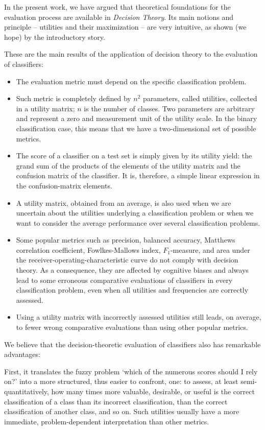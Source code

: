 \documentclass[\ifafour a4paper,12pt,\else a5paper,10pt,\fi%
onecolumn,oneside,article,%
british%
]{memoir}
\theoremstyle{remark}
\theoremstyle{innote}
\renewcommand*{\|}[1][]{\nonscript\:#1\vert\nonscript\:\mathopen{}}
\begin{document}
In the present work, we have argued that theoretical foundations for the evaluation process are available in \emph{Decision Theory}. Its main notions and principle -- utilities and their maximization -- are very intuitive, as shown (we hope) by the introductory story.

These are the main results of the application of decision theory to the evaluation of classifiers:
\begin{itemize}[--,wide]
\item The evaluation metric must depend on the specific classification problem.
\item Such metric is completely defined by $n^{2}$ parameters, called utilities, collected in a utility matrix; $n$ is the number of classes. Two parameters are arbitrary and represent a zero and measurement unit of the utility scale. In the binary classification case, this means that we have a two-dimensional set of possible metrics.
\item The score of a classifier on a test set is simply given by its utility yield: the grand sum of the products of the elements of the utility matrix and the confusion matrix of the classifier. It is, therefore, a simple linear expression in the confusion-matrix elements.
\item A utility matrix, obtained from an average, is also used when we are uncertain about the utilities underlying a classification problem or when we want to consider the average performance over several classification problems.
\item Some popular metrics such as precision, balanced accuracy, Matthews correlation coefficient, Fowlkes-Mallows index, $F_{1}$-measure, and area under the receiver-operating-characteristic curve do not comply with decision theory. As a consequence, they are affected by cognitive biases and always lead to some erroneous comparative evaluations of classifiers in every classification problem, even when all utilities and frequencies are correctly assessed.
\item Using a utility matrix with incorrectly assessed utilities still leads, on average, to fewer wrong comparative evaluations than using other popular metrics.
\end{itemize}

We believe that the decision-theoretic evaluation of classifiers also has remarkable advantages:

First, it translates the fuzzy problem \enquote*{which of the numerous scores should I rely on?} into a more structured, thus easier to confront, one: to assess, at least semi-quantitatively, how many times more valuable, desirable, or useful is the correct classification of a class than its incorrect classification, than the correct classification of another class, and so on. Such utilities usually have a more immediate, problem-dependent interpretation than other metrics.
\end{document}
